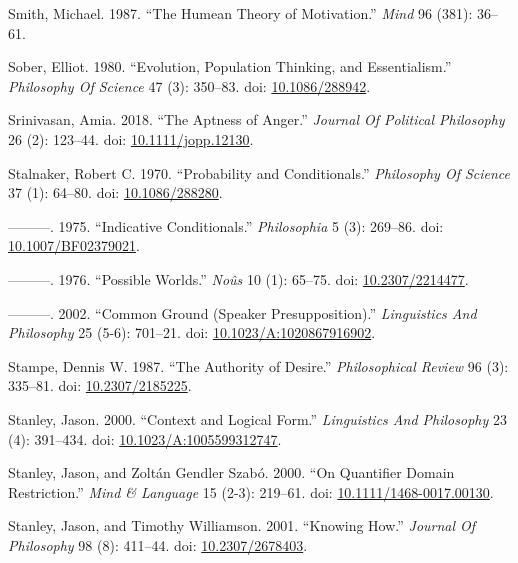 \documentclass[
  10pt,
  letterpaper,
  DIV=11,
  numbers=noendperiod,
  twoside]{scrartcl}
\newlength{\cslhangindent}
\newenvironment{CSLReferences}[2] %
 {\begin{list}{}{%
  \setlength{\itemindent}{0pt}
  \setlength{\leftmargin}{0pt}
  \setlength{\parsep}{0pt}
  \ifodd #1
   \setlength{\leftmargin}{\cslhangindent}
   \setlength{\itemindent}{-1\cslhangindent}
  \fi
  \setlength{\itemsep}{#2\baselineskip}}}
 {\end{list}}
\begin{document}
\begin{CSLReferences}{1}{0}
Smith, Michael. 1987. {``The Humean Theory of Motivation.''} \emph{Mind}
96 (381): 36--61.

Sober, Elliot. 1980. {``Evolution, Population Thinking, and
Essentialism.''} \emph{Philosophy Of Science} 47 (3): 350--83. doi:
\href{https://doi.org/10.1086/288942}{10.1086/288942}.

Srinivasan, Amia. 2018. {``The Aptness of Anger.''} \emph{Journal Of
Political Philosophy} 26 (2): 123--44. doi:
\href{https://doi.org/10.1111/jopp.12130}{10.1111/jopp.12130}.

Stalnaker, Robert C. 1970. {``Probability and Conditionals.''}
\emph{Philosophy Of Science} 37 (1): 64--80. doi:
\href{https://doi.org/10.1086/288280}{10.1086/288280}.

---------. 1975. {``Indicative Conditionals.''} \emph{Philosophia} 5
(3): 269--86. doi:
\href{https://doi.org/10.1007/BF02379021}{10.1007/BF02379021}.

---------. 1976. {``Possible Worlds.''} \emph{Noûs} 10 (1): 65--75. doi:
\href{https://doi.org/10.2307/2214477}{10.2307/2214477}.

---------. 2002. {``Common Ground (Speaker Presupposition).''}
\emph{Linguistics And Philosophy} 25 (5-6): 701--21. doi:
\href{https://doi.org/10.1023/A:1020867916902}{10.1023/A:1020867916902}.

Stampe, Dennis W. 1987. {``The Authority of Desire.''}
\emph{Philosophical Review} 96 (3): 335--81. doi:
\href{https://doi.org/10.2307/2185225}{10.2307/2185225}.

Stanley, Jason. 2000. {``Context and Logical Form.''} \emph{Linguistics
And Philosophy} 23 (4): 391--434. doi:
\href{https://doi.org/10.1023/A:1005599312747}{10.1023/A:1005599312747}.

Stanley, Jason, and Zoltán Gendler Szabó. 2000. {``On Quantifier Domain
Restriction.''} \emph{Mind \& Language} 15 (2-3): 219--61. doi:
\href{https://doi.org/10.1111/1468-0017.00130}{10.1111/1468-0017.00130}.

Stanley, Jason, and Timothy Williamson. 2001. {``Knowing How.''}
\emph{Journal Of Philosophy} 98 (8): 411--44. doi:
\href{https://doi.org/10.2307/2678403}{10.2307/2678403}.


\end{CSLReferences}
\end{document}
